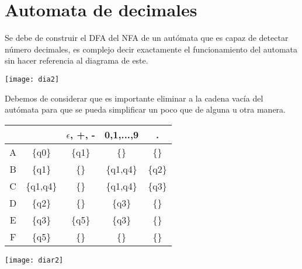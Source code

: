 \documentclass[12pt]{article}
\begin{document}
    \section{Automata de decimales}
	Se debe de construir el DFA del NFA de un autómata que es capaz de detectar número decimales, es complejo decir exactamente el funcionamiento del automata sin hacer referencia al diagrama de este.        
	 \begin{center}
            \texttt{[image: dia2]}
         \end{center}                                           
         Debemos de considerar que es importante eliminar a la cadena vacía del autómata para que se pueda simplificar un poco que de alguna u otra manera. 
         \begin{center}
          	 \begin{table}[ht]
                 \centering
                \begin{tabular}{c|c|c|c|c}
                    && $\epsilon$, +, -& 0,1,...,9  &.\\
               	\hline
		A&\{q0\}&\{q1\}&\{\}&\{\}\\
		B&\{q1\}&\{\}&\{q1,q4\}&\{q2\}\\
		C&\{q1,q4\}&\{\}&\{q1,q4\}&\{q3\}\\
		D&\{q2\}&\{\}&\{q3\}&\{\}\\
		E&\{q3\}&\{q5\}&\{q3\}&\{\}\\
		F&\{q5\}&\{\}&\{\}&\{\}\\
           	 \end{tabular}
            \end{table}
         \end{center}
          \begin{center}
            \texttt{[image: diar2]}
         \end{center}   
\end{document}
